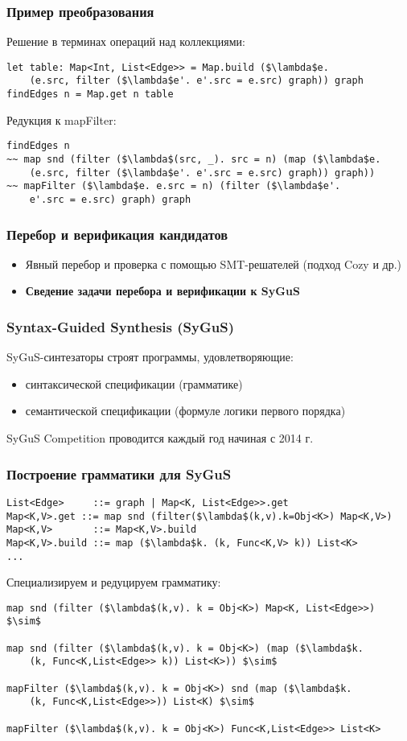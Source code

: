 \documentclass[14pt]{beamer}
\begin{document}
\begin{frame}[fragile]
\frametitle{Пример преобразования}
Решение в терминах операций над коллекциями:
\begin{lstlisting}[language=SolutionLang, mathescape=true]
let table: Map<Int, List<Edge>> = Map.build ($\lambda$e.
    (e.src, filter ($\lambda$e'. e'.src = e.src) graph)) graph
findEdges n = Map.get n table
\end{lstlisting}

Редукция к {\color{blue}mapFilter}:
\begin{lstlisting}[language=SolutionLang, mathescape=true]
findEdges n
~~ map snd (filter ($\lambda$(src, _). src = n) (map ($\lambda$e.
    (e.src, filter ($\lambda$e'. e'.src = e.src) graph)) graph))
~~ mapFilter ($\lambda$e. e.src = n) (filter ($\lambda$e'.
    e'.src = e.src) graph) graph
\end{lstlisting}
\end{frame}


\begin{frame}
\frametitle{Перебор и верификация кандидатов}
\begin{itemize}
    \item Явный перебор и проверка с помощью SMT-решателей (подход Cozy и др.)
    \item \textbf{Сведение задачи перебора и верификации к SyGuS}
\end{itemize}
\end{frame}


\begin{frame}
\frametitle{Syntax-Guided Synthesis (SyGuS)}
SyGuS-синтезаторы строят программы, удовлетворяющие:
\begin{itemize}
    \item синтаксической спецификации (грамматике)
    \item семантической спецификации (формуле логики первого порядка)
\end{itemize}
SyGuS Competition проводится каждый год начиная с 2014 г.
\end{frame}


\begin{frame}[fragile]
\frametitle{Построение грамматики для SyGuS}
\begin{lstlisting}[language=SyGuSLang, mathescape=true]
List<Edge>     ::= graph | Map<K, List<Edge>>.get
Map<K,V>.get ::= map snd (filter($\lambda$(k,v).k=Obj<K>) Map<K,V>)
Map<K,V>       ::= Map<K,V>.build
Map<K,V>.build ::= map ($\lambda$k. (k, Func<K,V> k)) List<K>
...
\end{lstlisting}
Специализируем и редуцируем грамматику:
\begin{lstlisting}[language=SyGuSLang, mathescape=true]
map snd (filter ($\lambda$(k,v). k = Obj<K>) Map<K, List<Edge>>) $\sim$

map snd (filter ($\lambda$(k,v). k = Obj<K>) (map ($\lambda$k.
    (k, Func<K,List<Edge>> k)) List<K>)) $\sim$

mapFilter ($\lambda$(k,v). k = Obj<K>) snd (map ($\lambda$k.
    (k, Func<K,List<Edge>>)) List<K) $\sim$

mapFilter ($\lambda$(k,v). k = Obj<K>) Func<K,List<Edge>> List<K>
\end{lstlisting}
\end{frame}
\end{document}
